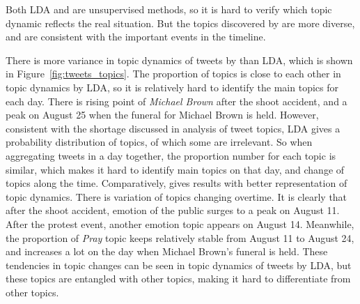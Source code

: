 Both LDA and \stlda are unsupervised methods, so it is hard to verify which topic dynamic reflects the real situation. But the topics discovered by \stlda are more diverse, and are consistent with the important events in the timeline.

There is more variance in topic dynamics of tweets by \stlda than LDA, which is shown in Figure~\ref{fig:tweets_topics}. The proportion of topics is close to each other in topic dynamics by LDA, so it is relatively hard to identify the main topics for each day. There is rising point of \emph{Michael Brown} after the shoot accident, and a peak on August 25 when the funeral for Michael Brown is held. However, consistent with the shortage discussed in analysis of tweet topics, LDA gives a probability distribution of topics, of which some are irrelevant. So when aggregating tweets in a day together, the proportion number for each topic is similar, which makes it hard to identify main topics on that day, and change of topics along the time. Comparatively, \stlda gives results with better representation of topic dynamics. There is variation of topics changing overtime. It is clearly that after the shoot accident, emotion of the public surges to a peak on August 11. After the protest event, another emotion topic appears on August 14. Meanwhile, the proportion of \emph{Pray} topic keeps relatively stable from August 11 to August 24, and increases a lot on the day when Michael Brown's funeral is held. These tendencies in topic changes can be seen in topic dynamics of tweets by LDA, but these topics are entangled with other topics, making it hard to differentiate from other topics.

